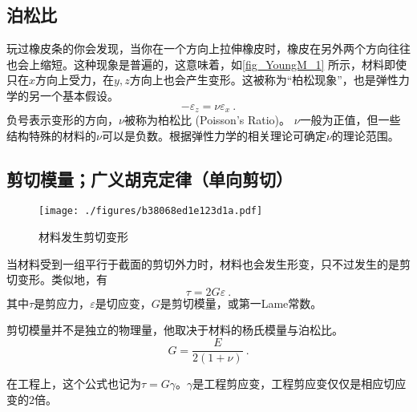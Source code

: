 \subsection{泊松比}
玩过橡皮条的你会发现，当你在一个方向上拉伸橡皮时，橡皮在另外两个方向往往也会上缩短。这种现象是普遍的，这意味着，如\autoref{fig_YoungM_1} 所示，材料即使只在$x$方向上受力，在$y,z$方向上也会产生变形。这被称为“柏松现象”，也是弹性力学的另一个基本假设。
\begin{equation}
-\varepsilon_z= \nu \varepsilon_x~.
\end{equation}
负号表示变形的方向，$\nu$被称为柏松比 (Poisson's Ratio)。 $\nu$一般为正值，但一些结构特殊的材料的$\nu$可以是负数。根据弹性力学的相关理论可确定$\nu$的理论范围。%

\subsection{剪切模量；广义胡克定律（单向剪切）}
\begin{figure}[ht]
\centering
\texttt{[image: ./figures/b38068ed1e123d1a.pdf]}
\caption{材料发生剪切变形} \label{fig_YoungM_2}
\end{figure}
当材料受到一组平行于截面的剪切外力时，材料也会发生形变，只不过发生的是剪切变形。类似地，有
\begin{equation}
\tau=2G\varepsilon~.
\end{equation}
其中$\tau$是剪应力，$\varepsilon$是切应变，$G$是剪切模量，或第一Lame常数。

剪切模量并不是独立的物理量，他取决于材料的杨氏模量与泊松比。
\begin{equation}
G = \frac{E}{2(1+\nu)}~.
\end{equation}

在工程上，这个公式也记为$\tau=G\gamma$。$\gamma$是工程剪应变，工程剪应变仅仅是相应切应变的$2$倍。
